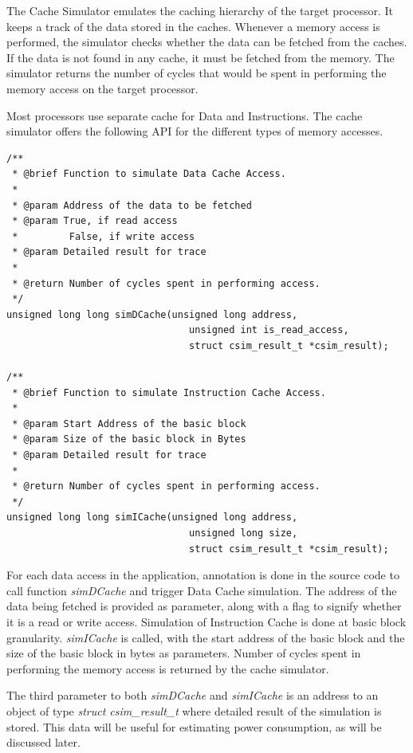 The Cache Simulator emulates the caching hierarchy of the target processor. It keeps a track of the data stored in the caches. Whenever a memory access is performed, the simulator checks whether the data can be fetched from the caches. If the data is not found in any cache, it must be fetched from the memory. The simulator returns the number of cycles that would be spent in performing the memory access on the target processor.

Most processors use separate cache for Data and Instructions. The cache simulator offers the following API for the different types of memory accesses.

\begin{lstlisting}[numbers=none, frame=none]
/**
 * @brief Function to simulate Data Cache Access.
 *
 * @param Address of the data to be fetched
 * @param True, if read access
 *         False, if write access
 * @param Detailed result for trace
 *
 * @return Number of cycles spent in performing access.
 */
unsigned long long simDCache(unsigned long address,
                                unsigned int is_read_access,
                                struct csim_result_t *csim_result);
                                
/**
 * @brief Function to simulate Instruction Cache Access.
 *
 * @param Start Address of the basic block
 * @param Size of the basic block in Bytes
 * @param Detailed result for trace 
 *
 * @return Number of cycles spent in performing access.
 */
unsigned long long simICache(unsigned long address,
                                unsigned long size,
                                struct csim_result_t *csim_result);
\end{lstlisting}

For each data access in the application, annotation is done in the source code to call function \emph{simDCache} and trigger Data Cache simulation. The address of the data being fetched is provided as parameter, along with a flag to signify whether it is a read or write access. Simulation of Instruction Cache is done at basic block granularity. \emph{simICache} is called, with the start address of the basic block and the size of the basic block in bytes as parameters. Number of cycles spent in performing the memory access is returned by the cache simulator.

The third parameter to both \emph{simDCache} and \emph{simICache} is an address to an object of type \emph{struct csim\_result\_t} where detailed result of the simulation is stored. This data will be useful for estimating power consumption, as will be discussed later.

